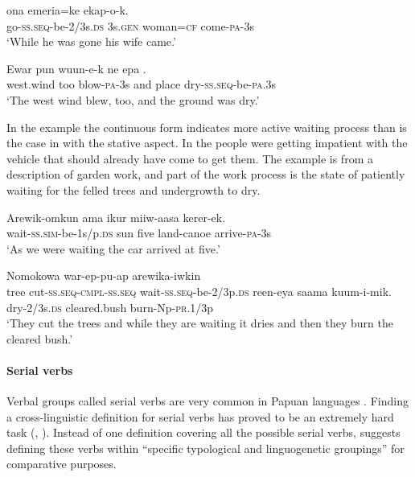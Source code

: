 \ea%
\label{ex:3:x358}
\gll {} ona emeria=ke ekap-o-k. \\
go-\textsc{ss}.\textsc{seq}-be-2/3s.\textsc{ds} 3s.\textsc{gen} woman=\textsc{cf} come-\textsc{pa}-3s\\
\glt`While he was gone his wife came.'
\z

\ea%
\label{ex:3:x1047}
\gll Ewar pun wuun-e-k ne epa . \\
west.wind too blow-\textsc{pa}-3s and place dry-\textsc{ss}.\textsc{seq}-be-\textsc{pa}.3s\\
\glt`The west wind blew, too, and the ground was dry.'
\z

In the example  the continuous form indicates more active waiting process than is the case in  with the stative aspect. In  the people were getting impatient with the vehicle that should already have come to get them. The example  is from a description of garden work, and part of the work process is the state of patiently waiting for the felled trees and undergrowth to dry. 

\ea%
\label{ex:3:x359}
\gll Arewik-omkun ama ikur miiw-aasa kerer-ek. \\
wait-\textsc{ss}.\textsc{sim}-be-1s/p.\textsc{ds} sun five land-canoe arrive-\textsc{pa}-3s\\
\glt`As we were waiting the car arrived at five.'
\z

\ea%
\label{ex:3:x360}
\gll Nomokowa war-ep-pu-ap arewika-iwkin \\
tree cut-\textsc{ss}.\textsc{seq}-\textsc{cmpl}-\textsc{ss}.\textsc{seq} wait-\textsc{ss}.\textsc{seq}-be-2/3p.\textsc{ds}
reen-eya saama kuum-i-mik.
dry-2/3s.\textsc{ds} cleared.bush burn-Np-\textsc{pr}.1/3p\\
\glt`They cut the trees and while they are waiting it dries and then they burn the cleared bush.' 
\z

\paragraph{Serial verbs} \label{sec:3.8.5.1.2}
{}
Verbal groups called serial verbs are very common in Papuan languages \citep[116]{Foley1986}. Finding a cross-linguistic definition for serial verbs has proved to be an extremely hard task (\citealt[5]{Sebba1987}, \citealt[1]{Lord1993}). Instead of one definition covering all the possible serial verbs, \citet[19]{Crowley2002} suggests defining these verbs within ``{specific typological and linguogenetic groupings}'' for comparative purposes. 

